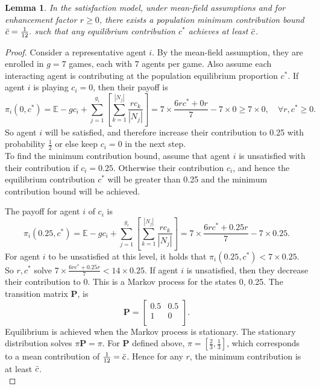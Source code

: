 \newtheorem{lemma_mcb}[theorem]{Lemma} \label{mcb}
\begin{lemma_mcb}
In the \emph{satisfaction} model, under mean-field assumptions and for enhancement factor $r \geq0$, there exists a population minimum contribution bound $\Bar{c} = \tfrac{1}{12}.$ such that any equilibrium contribution $c^*$ achieves at least $\Bar{c}$.  \end{lemma_mcb}
\begin{proof}
Consider a representative agent $i$. By the mean-field assumption, they are enrolled in $g=7$ games, each with $7$ agents per game. Also assume each interacting agent is contributing at the population equilibrium proportion $c^*$. If agent $i$ is playing $c_i = 0$, then their payoff is \\
\begin{equation}
    \pi_i(0, c^*)= \mathbb E - gc_i + \sum_{j=1}^{g_i} [\sum_{k=1}^{|N_j|} \frac{rc_k}{|N_j|}] =   7\times\frac{6rc^* + 0r}{7}-7\times0 \geq 7\times0, \quad \forall r, c^* \geq 0.
\end{equation}
So agent $i$ will be satisfied, and therefore increase their contribution to 0.25 with probability $\tfrac{1}{2}$ or else keep $c_i = 0$ in the next step. \\

To find the minimum contribution bound, assume that agent $i$ is unsatisfied with their contribution if $c_i = 0.25$. Otherwise their contribution $c_i$, and hence the equilibrium contribution $c^*$ will be greater than 0.25 and the minimum contribution bound will be achieved. 

The payoff for agent $i$ of $c_i$ is  \\
\begin{equation} \label{unsat}
    \pi_i(0.25, c^*)= \mathbb E - gc_i + \sum_{j=1}^{g_i} [\sum_{k=1}^{|N_j|} \frac{rc_k}{|N_j|}]  =   7\times\frac{6rc^* + 0.25r}{7}-7\times0.25. 
\end{equation}
For agent $i$ to be unsatisfied at this level, it holds that $\pi_i(0.25, c^*) <7\times 0.25$. So $r,c^*$ solve $7\times\frac{6rc^* + 0.25r}{7}<14\times0.25$. If agent $i$ is unsatisfied, then they decrease their contribution to 0. This is a Markov process for the states 0, 0.25. The transition matrix $\mathbf{P}$, is $$\mathbf P = \begin{bmatrix} 0.5& 0.5 \\
1& 0 \\
\end{bmatrix}. $$  Equilibrium is achieved when the Markov process is stationary. The stationary distribution solves $\pi \mathbf{P} = \pi$. For $\mathbf{P}$ defined above, $\pi = [\tfrac{2}{3}, \tfrac{1}{3}]$, which corresponds to a mean contribution of $\tfrac{1}{12} =\Bar{c}$. Hence for any $r$, the minimum contribution is at least $\Bar{c}$. \\
\end{proof}


